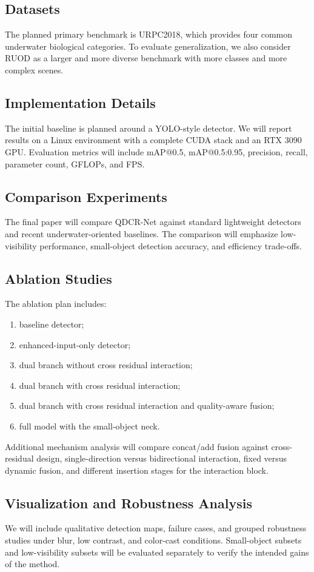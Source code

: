 \subsection*{Datasets}
The planned primary benchmark is URPC2018, which provides four common underwater biological
categories. To evaluate generalization, we also consider RUOD as a larger and more diverse
benchmark with more classes and more complex scenes.

\subsection*{Implementation Details}
The initial baseline is planned around a YOLO-style detector. We will report results on a
Linux environment with a complete CUDA stack and an RTX 3090 GPU. Evaluation metrics will
include mAP@0.5, mAP@0.5:0.95, precision, recall, parameter count, GFLOPs, and FPS.

\subsection*{Comparison Experiments}
The final paper will compare QDCR-Net against standard lightweight detectors and recent
underwater-oriented baselines. The comparison will emphasize low-visibility performance,
small-object detection accuracy, and efficiency trade-offs.

\subsection*{Ablation Studies}
The ablation plan includes:
\begin{enumerate}[leftmargin=*]
  \item baseline detector;
  \item enhanced-input-only detector;
  \item dual branch without cross residual interaction;
  \item dual branch with cross residual interaction;
  \item dual branch with cross residual interaction and quality-aware fusion;
  \item full model with the small-object neck.
\end{enumerate}

Additional mechanism analysis will compare concat/add fusion against cross-residual design,
single-direction versus bidirectional interaction, fixed versus dynamic fusion, and different
insertion stages for the interaction block.

\subsection*{Visualization and Robustness Analysis}
We will include qualitative detection maps, failure cases, and grouped robustness studies
under blur, low contrast, and color-cast conditions. Small-object subsets and low-visibility
subsets will be evaluated separately to verify the intended gains of the method.
